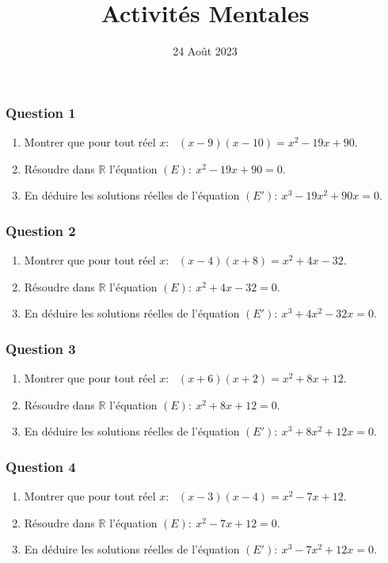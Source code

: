 \documentclass[15pt, mathserif]{beamer}
\title{Activités Mentales}
\date{24 Août 2023}
\newcommand{\R}{\mathbb{R}}			%
\begin{document}
\begin{frame}
    \titlepage
\end{frame}

\begin{frame} 
	\frametitle{Question 1}
\begin{enumerate} 
 	 	 \item Montrer que pour tout réel $x$:~ $(x-9)(x-10)=x^2-19x+90$. 
 	  \item Résoudre dans $\R$ l'équation $(E):~x^2-19x+90= 0$.  
 	 \item En déduire les solutions réelles de l'équation $(E'):~x^3-19x^2+90x = 0$. 
 \end{enumerate}\end{frame}


\begin{frame} 
	\frametitle{Question 2}
\begin{enumerate} 
 	 	 \item Montrer que pour tout réel $x$:~ $(x-4)(x+8)=x^2+4x-32$. 
 	  \item Résoudre dans $\R$ l'équation $(E):~x^2+4x-32= 0$.  
 	 \item En déduire les solutions réelles de l'équation $(E'):~x^3+4x^2-32x = 0$. 
 \end{enumerate}\end{frame}


\begin{frame} 
	\frametitle{Question 3}
\begin{enumerate} 
 	 	 \item Montrer que pour tout réel $x$:~ $(x+6)(x+2)=x^2+8x+12$. 
 	  \item Résoudre dans $\R$ l'équation $(E):~x^2+8x+12= 0$.  
 	 \item En déduire les solutions réelles de l'équation $(E'):~x^3+8x^2+12x = 0$. 
 \end{enumerate}\end{frame}


\begin{frame} 
	\frametitle{Question 4}
\begin{enumerate} 
 	 	 \item Montrer que pour tout réel $x$:~ $(x-3)(x-4)=x^2-7x+12$. 
 	  \item Résoudre dans $\R$ l'équation $(E):~x^2-7x+12= 0$.  
 	 \item En déduire les solutions réelles de l'équation $(E'):~x^3-7x^2+12x = 0$. 
 \end{enumerate}\end{frame}
\end{document}
